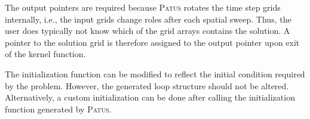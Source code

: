 The output pointers are required because \textsc{Patus} rotates the time step grids internally,
i.e., the input grids change roles after each spatial sweep. Thus, the user does typically not know which of the grid arrays
contains the solution. A pointer to the solution grid is therefore assigned to the output pointer
upon exit of the kernel function.

The initialization function can be modified to reflect the initial condition required by the problem. However, the generated loop
structure should not be altered. Alternatively, a custom initialization can be done after calling the initialization function
generated by \textsc{Patus}.

